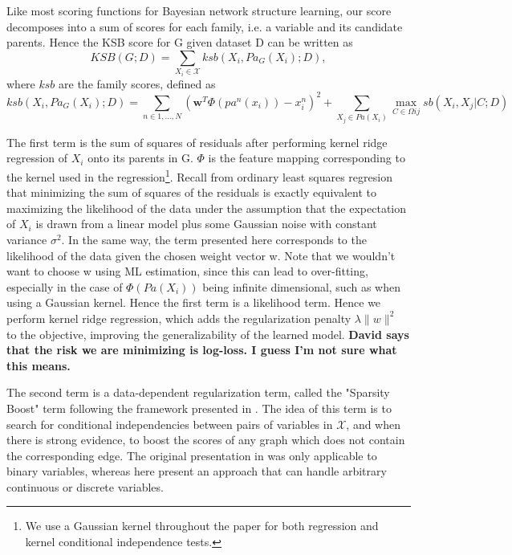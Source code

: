 \documentclass{article} %
\begin{document}
Like most scoring functions for Bayesian network structure learning, our score decomposes into a sum of scores for each family, i.e. a variable and its candidate parents.  Hence the KSB score for G given dataset D can be written as \begin{equation} KSB(G;D) = \sum_{X_i \in \mathcal{X}} ksb(X_i, Pa_G(X_i); D), \end{equation} where $ksb$ are the family scores, defined as \begin{equation} ksb(X_i, Pa_G(X_i); D) = \sum_{n \in 1, \ldots, N} \left(\mathbf{w}^T\Phi(pa^n(x_i)) - x_i^n \right)^2 + \sum_{X_j \in Pa(X_i)} \max_{C \in \Omega{ij}} sb(X_i, X_j|C; D) \end{equation}  

The first term is the sum of squares of residuals after performing kernel ridge regression of $X_i$ onto its parents in G.  $\Phi$ is the feature mapping corresponding to the kernel used in the regression\footnote{We use a Gaussian kernel throughout the paper for both regression and kernel conditional independence tests.}.  Recall from ordinary least squares regresion that minimizing the sum of squares of the residuals is exactly equivalent to maximizing the likelihood of the data under the assumption that the expectation of $X_i$ is drawn from a linear model plus some Gaussian noise with constant variance $\sigma^2$.  In the same way, the term presented here corresponds to the likelihood of the data given the chosen weight vector w.  Note that we wouldn't want to choose w using ML estimation, since this can lead to over-fitting, especially in the case of $\Phi(Pa(X_i))$ being infinite dimensional, such as when using a Gaussian kernel.  Hence the first term is a likelihood term.  Hence we perform kernel ridge regression, which adds the regularization penalty $\lambda \| w\|^2$ to the objective, improving the generalizability of the learned model.  {\bf David says that the risk we are minimizing is log-loss.  I guess I'm not sure what this means.}

The second term is a data-dependent regularization term, called the "Sparsity Boost" term following the framework presented in \cite{brenner2013sparsityboost}.  The idea of this term is to search for conditional independencies between pairs of variables in $\mathcal{X}$, and when there is strong evidence, to boost the scores of any graph which does not contain the corresponding edge.  The original presentation in \cite{brenner2013sparsityboost} was only applicable to binary variables, whereas here present an approach that can handle arbitrary continuous or discrete variables. 
\end{document}
